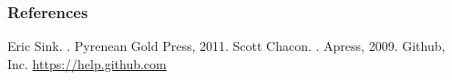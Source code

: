 \documentclass{beamer}
\begin{document}
\begin{frame}[allowframebreaks]
  \frametitle<presentation>{References}    
  \begin{thebibliography}{10}    
  \beamertemplatebookbibitems
    Eric Sink.
    .
    \newblock Pyrenean Gold Press, 2011.
    Scott Chacon.
    .
    \newblock Apress, 2009.
  \beamertemplatearticlebibitems
    Github, Inc.
    \newblock \url{https://help.github.com}
  \end{thebibliography}
\end{frame}
\end{document}
